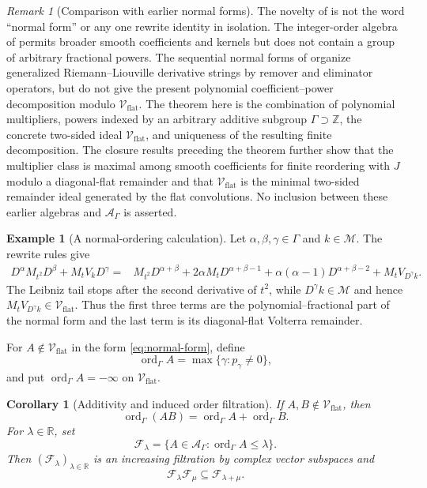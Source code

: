 \documentclass[11pt]{article}
\numberwithin{equation}{section}
\newtheorem{corollary}{Corollary}
\theoremstyle{definition}
\newtheorem{example}{Example}
\theoremstyle{remark}
\newtheorem{remark}{Remark}
\newcommand{\R}{\mathbb R}
\newcommand{\Z}{\mathbb Z}
\newcommand{\M}{\mathcal M}
\newcommand{\A}{\mathcal A}
\newcommand{\Vflat}{\mathcal V_{\mathrm{flat}}}
\newcommand{\ord}{\operatorname{ord}}
\begin{document}
\begin{remark}[Comparison with earlier normal forms]\label{rem:normal-form-comparison}
The novelty of  is not the word ``normal form'' or any one rewrite identity in isolation. The integer-order algebra of \cite{Haghany2019} permits broader smooth coefficients and kernels but does not contain a group of arbitrary fractional powers. The sequential normal forms of \cite{Kleiner2022} organize generalized Riemann--Liouville derivative strings by remover and eliminator operators, but do not give the present polynomial coefficient--power decomposition modulo $\Vflat$. The theorem here is the combination of polynomial multipliers, powers indexed by an arbitrary additive subgroup $\Gamma\supset\Z$, the concrete two-sided ideal $\Vflat$, and uniqueness of the resulting finite decomposition. The closure results preceding the theorem further show that the multiplier class is maximal among smooth coefficients for finite reordering with $J$ modulo a diagonal-flat remainder and that $\Vflat$ is the minimal two-sided remainder ideal generated by the flat convolutions. No inclusion between these earlier algebras and $\A_\Gamma$ is asserted.
\end{remark}

\begin{example}[A normal-ordering calculation]\label{ex:normal-ordering}
Let $\alpha,\beta,\gamma\in\Gamma$ and $k\in\M$. The rewrite rules give
\begin{align*}
D^\alpha M_{t^2}D^\beta+M_tV_kD^\gamma
={}&M_{t^2}D^{\alpha+\beta}
+2\alpha M_tD^{\alpha+\beta-1}
+\alpha(\alpha-1)D^{\alpha+\beta-2}
+M_tV_{D^\gamma k}.
\end{align*}
The Leibniz tail stops after the second derivative of $t^2$, while $D^\gamma k\in\M$ and hence $M_tV_{D^\gamma k}\in\Vflat$. Thus the first three terms are the polynomial--fractional part of the normal form and the last term is its diagonal-flat Volterra remainder.
\end{example}

For $A\notin\Vflat$ in the form \eqref{eq:normal-form}, define
\begin{equation*}
\ord_\Gamma A=\max\{\gamma:p_\gamma\ne0\},
\end{equation*}
and put $\ord_\Gamma A=-\infty$ on $\Vflat$.

\begin{corollary}[Additivity and induced order filtration]\label{cor:order-filtration}
If $A,B\notin\Vflat$, then
\begin{equation}
\ord_\Gamma(AB)=\ord_\Gamma A+\ord_\Gamma B.
\end{equation}
For $\lambda\in\R$, set
\begin{equation*}
\mathcal F_\lambda=\{A\in\A_\Gamma:\ord_\Gamma A\le\lambda\}.
\end{equation*}
Then $(\mathcal F_\lambda)_{\lambda\in\R}$ is an increasing filtration by complex vector subspaces and
\begin{equation*}
\mathcal F_\lambda\mathcal F_\mu\subseteq\mathcal F_{\lambda+\mu}.
\end{equation*}
\end{corollary}
\end{document}

